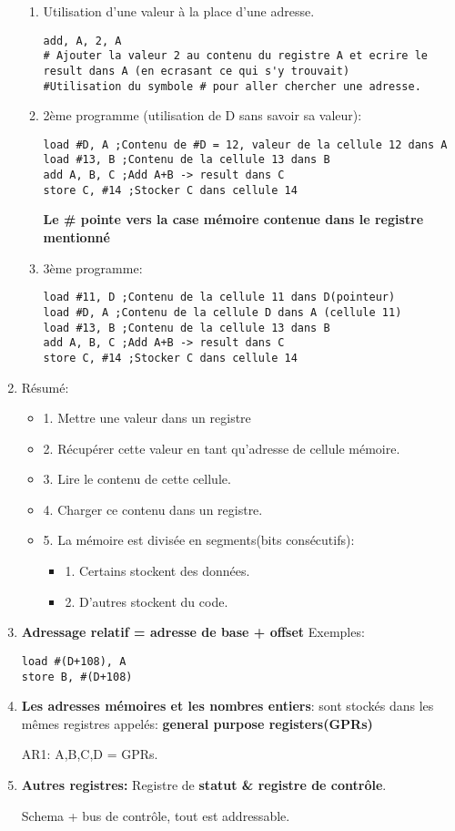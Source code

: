\begin{enumerate}
\begin{enumerate}
\item Utilisation d'une valeur à la place d'une adresse.
\begin{lstlisting}
add, A, 2, A 
# Ajouter la valeur 2 au contenu du registre A et ecrire le result dans A (en ecrasant ce qui s'y trouvait)
#Utilisation du symbole # pour aller chercher une adresse.
\end{lstlisting}
\item 2ème programme (utilisation de D sans savoir sa valeur):
\begin{lstlisting}
load #D, A ;Contenu de #D = 12, valeur de la cellule 12 dans A
load #13, B ;Contenu de la cellule 13 dans B
add A, B, C ;Add A+B -> result dans C
store C, #14 ;Stocker C dans cellule 14
\end{lstlisting}
\textbf{Le \# pointe vers la case mémoire contenue dans le registre mentionné}
\item 3ème programme:
\begin{lstlisting}
load #11, D ;Contenu de la cellule 11 dans D(pointeur)
load #D, A ;Contenu de la cellule D dans A (cellule 11) 
load #13, B ;Contenu de la cellule 13 dans B
add A, B, C ;Add A+B -> result dans C 
store C, #14 ;Stocker C dans cellule 14
\end{lstlisting}
\end{enumerate}
\item Résumé:
\begin{itemize}
  \item1. Mettre une valeur dans un registre
  \item2. Récupérer cette valeur en tant qu'adresse de cellule mémoire.
  \item3. Lire le contenu de cette cellule.
  \item4. Charger ce contenu dans un registre.
  \item5. La mémoire est divisée en segments(bits consécutifs):
  \begin{itemize}
    \item1. Certains stockent des données.
    \item2. D'autres stockent du code.
  \end{itemize}
\end{itemize}
\item\textbf{Adressage relatif = adresse de base + offset}
Exemples:
\begin{lstlisting}
load #(D+108), A
store B, #(D+108)
\end{lstlisting}
\item \textbf{Les adresses mémoires et les nombres entiers}: sont stockés dans les mêmes registres appelés: \textbf{general purpose registers(GPRs)}

AR1: A,B,C,D = GPRs.
\item \textbf{Autres registres:}
Registre de \textbf{statut \& registre de contrôle}.

Schema + bus de contrôle, tout est addressable.
\end{enumerate}
